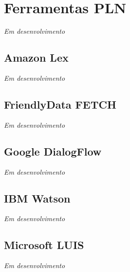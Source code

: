 \section{Ferramentas PLN}
\label{sec:chap03_existingtools}

\textit{Em desenvolvimento}

\subsection{Amazon Lex}
\textit{Em desenvolvimento}

\subsection{FriendlyData FETCH}
\textit{Em desenvolvimento}

\subsection{Google DialogFlow}
\textit{Em desenvolvimento}

\subsection{IBM Watson}
\textit{Em desenvolvimento}

\subsection{Microsoft LUIS}
\textit{Em desenvolvimento}
